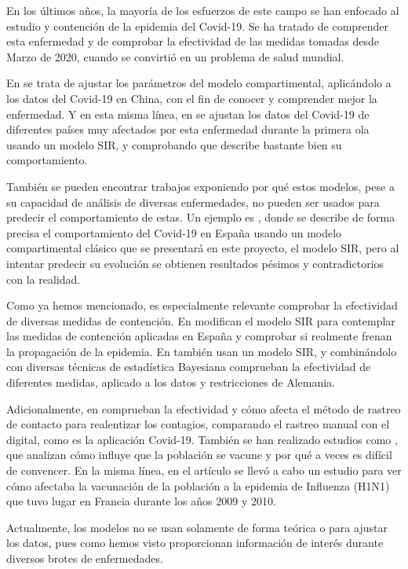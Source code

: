 En los últimos años, la mayoría de los esfuerzos de este campo se han enfocado al estudio y contención de la epidemia del Covid-19. Se ha tratado de comprender esta enfermedad y de comprobar la efectividad de las medidas tomadas desde Marzo de 2020, cuando se convirtió en un problema de salud mundial.

En \cite{demongeotSIEpidemicModel} se trata de ajustar los parámetros del modelo compartimental, aplicándolo a los datos del Covid-19 en China, con el fin de conocer y comprender mejor la enfermedad. Y en esta misma línea, en \cite{enrique_amaro} se ajustan los datos del Covid-19 de diferentes países muy afectados por esta enfermedad durante la primera ola usando un modelo SIR, y comprobando que describe bastante bien su comportamiento.

También se pueden encontrar trabajos exponiendo por qué estos modelos, pese a su capacidad de análisis de diversas enfermedades, no pueden ser usados para predecir el comportamiento de estas. Un ejemplo es \cite{turningpoint}, donde se describe de forma precisa el comportamiento del Covid-19 en España usando un modelo compartimental clásico que se presentará en este proyecto, el modelo SIR, pero al intentar predecir su evolución se obtienen resultados pésimos y contradictorios con la realidad.

Como ya hemos mencionado, es especialmente relevante comprobar la efectividad de diversas medidas de contención. En \cite{gutierrez2020analisis} modifican el modelo SIR para contemplar las medidas de contención aplicadas en España y comprobar si realmente frenan la propagación de la epidemia. En \cite{inferringinterventions} también usan un modelo SIR, y combinándolo con diversas técnicas de estadística Bayesiana comprueban la efectividad de diferentes medidas, aplicado a los datos y restricciones de Alemania.

Adicionalmente, en \cite{Mancastroppa2021} comprueban la efectividad y cómo afecta el método de rastreo de contacto para realentizar los contagios, comparando el rastreo manual con el digital, como es la aplicación Covid-19. También se han realizado estudios como \cite{vaccinationproblem}, que analizan cómo influye que la población se vacune y por qué a veces es difícil de convencer. En la misma línea, en el artículo \cite{Laguzet2015} se llevó a cabo un estudio para ver cómo afectaba la vacunación de la población a la epidemia de Influenza (H1N1) que tuvo lugar en Francia durante los años 2009 y 2010.

Actualmente, los modelos no se usan solamente de forma teórica o para ajustar los datos, pues como hemos visto proporcionan información de interés durante diversos brotes de enfermedades.



